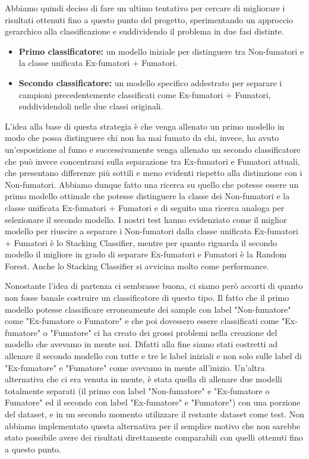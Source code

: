 \documentclass{article}
\begin{document}
\begin{multicols}{2}
Abbiamo quindi deciso di fare un ultimo tentativo per cercare di migliorare i risultati ottenuti fino a questo punto del progetto, sperimentando un approccio gerarchico alla classificazione e suddividendo il problema in due fasi distinte.

\begin{itemize}[leftmargin=*]
    \item \textbf{Primo classificatore:} un modello iniziale per distinguere tra Non-fumatori e la classe unificata Ex-fumatori + Fumatori.
    \item \textbf{Secondo classificatore:} un modello specifico addestrato per separare i campioni precedentemente classificati come Ex-fumatori + Fumatori, suddividendoli nelle due classi originali.
\end{itemize}

L'idea alla base di questa strategia è che venga allenato un primo modello in modo che possa distinguere chi non ha mai fumato da chi, invece, ha avuto un'esposizione al fumo e successivamente venga allenato un secondo classificatore che può invece concentrarsi sulla separazione tra Ex-fumatori e Fumatori attuali, che presentano differenze più sottili e meno evidenti rispetto alla distinzione con i Non-fumatori. 
Abbiamo dunque fatto una ricerca su quello che potesse essere un primo modello ottimale che potesse distinguere la classe dei Non-fumatori e la classe unificata Ex-fumatori + Fumatori e di seguito una ricerca analoga per selezionare il secondo modello. 
I nostri test hanno evidenziato come il miglior modello per riuscire a separare i Non-fumatori dalla classe unificata Ex-fumatori + Fumatori è lo Stacking Classifier, mentre per quanto riguarda il secondo modello il migliore in grado di separare Ex-fumatori e Fumatori è la Random Forest. 
Anche lo Stacking Classifier si avvicina molto come performance.

Nonostante l'idea di partenza ci sembrasse buona, ci siamo però accorti di quanto non fosse banale costruire un classificatore di questo tipo. 
Il fatto che il primo modello potesse classificare erroneamente dei sample con label "Non-fumatore" come "Ex-fumatore o Fumatore" e che poi dovessero essere classificati come "Ex-fumatore" o "Fumatore" ci ha creato dei grossi problemi nella creazione del modello che avevamo in mente noi. 
Difatti alla fine siamo stati costretti ad allenare il secondo modello con tutte e tre le label iniziali e non solo sulle label di "Ex-fumatore" e "Fumatore" come avevamo in mente all'inizio. 
Un'altra alternativa che ci era venuta in mente, è stata quella di allenare due modelli totalmente separati (il primo con label "Non-fumatore" e "Ex-fumatore o Fumatore" ed il secondo con label "Ex-fumatore" e "Fumatore") con una porzione del dataset, e in un secondo momento utilizzare il restante dataset come test. 
Non abbiamo implementato questa alternativa per il semplice motivo che non sarebbe stato possibile avere dei risultati direttamente comparabili con quelli ottenuti fino a questo punto.



\end{multicols}
\end{document}
